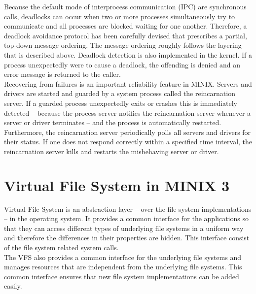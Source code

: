 Because the default mode of interprocess communication (IPC) are synchronous calls, deadlocks can occur when two or more processes simultaneously try to communicate and all processes are blocked waiting for one another. Therefore, a deadlock avoidance protocol has been carefully devised that prescribes a partial, top-down message ordering. The message ordering roughly follows the layering that is described above. Deadlock detection is also implemented in the kernel. If a process unexpectedly were to cause a deadlock, the offending is denied and an error message is returned to the caller. \\

Recovering from failures is an important reliability feature in MINIX. Servers and drivers are started and guarded by a system process called the reincarnation server. If a guarded process unexpectedly exits or crashes this is immediately detected – because the process server notifies the reincarnation server whenever a server or driver terminates – and the process is automatically restarted. Furthermore, the reincarnation server periodically polls all servers and drivers for their status. If one does not respond correctly within a specified time interval, the reincarnation server kills and restarts the misbehaving server or driver.

\section{Virtual File System in MINIX 3}

Virtual File System is an abstraction layer – over the file system implementations – in the operating system. It provides a common interface for the applications so that they can access different types of underlying file systems in a uniform way and therefore the differences in their properties are hidden. This interface consist of the file system related system calls.\\

The VFS also provides a common interface for the underlying file systems and manages resources that are independent from the underlying file systems. This common interface ensures that new file system implementations can be added easily.

